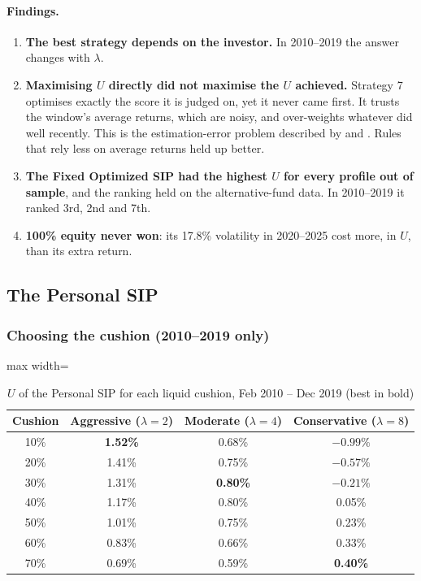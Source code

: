 \paragraph{Findings.}
\begin{enumerate}
  \item \textbf{The best strategy depends on the investor.} In 2010--2019 the answer changes with
        $\lambda$.
  \item \textbf{Maximising $U$ directly did not maximise the $U$ achieved.} Strategy 7 optimises
        exactly the score it is judged on, yet it never came first. It trusts the window's average
        returns, which are noisy, and over-weights whatever did well recently. This is the
        estimation-error problem described by \citet{michaud1989} and \citet{chopra1993}. Rules that
        rely less on average returns held up better.
  \item \textbf{The Fixed Optimized SIP had the highest $U$ for every profile out of sample}, and
        the ranking held on the alternative-fund data. In 2010--2019 it ranked 3rd, 2nd and 7th.
  \item \textbf{100\% equity never won}: its 17.8\% volatility in 2020--2025 cost more, in $U$,
        than its extra return.
\end{enumerate}

\subsection{The Personal SIP}
\label{sec:res-personal}

\subsubsection{Choosing the cushion (2010--2019 only)}

\begin{table}[H]
\centering
\caption{$U$ of the Personal SIP for each liquid cushion, Feb 2010 -- Dec 2019 (best in bold)}
\label{tab:cushion}
\begin{adjustbox}{max width=\textwidth}
\begin{tabular}{@{}cccc@{}}
\toprule
Cushion & Aggressive ($\lambda=2$) & Moderate ($\lambda=4$) & Conservative ($\lambda=8$) \\
\midrule
10\% & \textbf{1.52\%} & 0.68\% & $-0.99\%$ \\
20\% & 1.41\% & 0.75\% & $-0.57\%$ \\
30\% & 1.31\% & \textbf{0.80\%} & $-0.21\%$ \\
40\% & 1.17\% & 0.80\% & 0.05\% \\
50\% & 1.01\% & 0.75\% & 0.23\% \\
60\% & 0.83\% & 0.66\% & 0.33\% \\
70\% & 0.69\% & 0.59\% & \textbf{0.40\%} \\
\bottomrule
\end{tabular}
\end{adjustbox}
\end{table}

